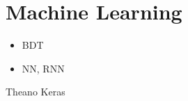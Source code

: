 \chapter{Machine Learning}
\label{sec:ml}

\begin{itemize}
\item BDT
\item NN, RNN
\end{itemize}


Theano \cite{theano}
Keras \cite{keras}
